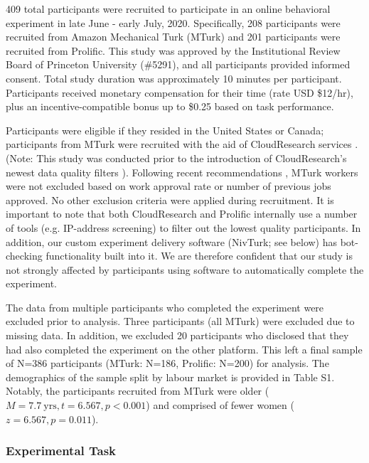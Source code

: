 \documentclass[a4paper,notitlepage,12pt]{article}
\begin{document}
\begin{refsection}[main]
409 total participants were recruited to participate in an online behavioral experiment in late June - early July, 2020. Specifically, 208 participants were recruited from Amazon Mechanical Turk (MTurk) and 201 participants were recruited from Prolific. This study was approved by the Institutional Review Board of Princeton University (\#5291), and all participants provided informed consent. Total study duration was approximately 10 minutes per participant. Participants received monetary compensation for their time (rate USD \$12/hr), plus an incentive-compatible bonus up to \$0.25 based on task performance. 

Participants were eligible if they resided in the United States or Canada; participants from MTurk were recruited with the aid of CloudResearch services \cite{litman2017turkprime}. (Note: This study was conducted prior to the introduction of CloudResearch's newest data quality filters \cite{cloudresearch_2020}). Following recent recommendations \cite{robinson2019tapped}, MTurk workers were not excluded based on work approval rate or number of previous jobs approved. No other exclusion criteria were applied during recruitment. It is important to note that both CloudResearch and Prolific internally use a number of tools (e.g. IP-address screening) to filter out the lowest quality participants. In addition, our custom experiment delivery software (NivTurk; see below) has bot-checking functionality built into it. We are therefore confident that our study is not strongly affected by participants using software to automatically complete the experiment.

The data from multiple participants who completed the experiment were excluded prior to analysis. Three participants (all MTurk) were excluded due to missing data. In addition, we excluded 20 participants who disclosed that they had also completed the experiment on the other platform. This left a final sample of N=386 participants (MTurk: N=186, Prolific: N=200) for analysis. The demographics of the sample split by labour market is provided in Table S1. Notably, the participants recruited from MTurk were older ($M = 7.7 \ \text{yrs}, t = 6.567, p < 0.001$) and comprised of fewer women ($z = 6.567, p = 0.011$). 

\subsubsection{Experimental Task}


\end{refsection}
\end{document}
